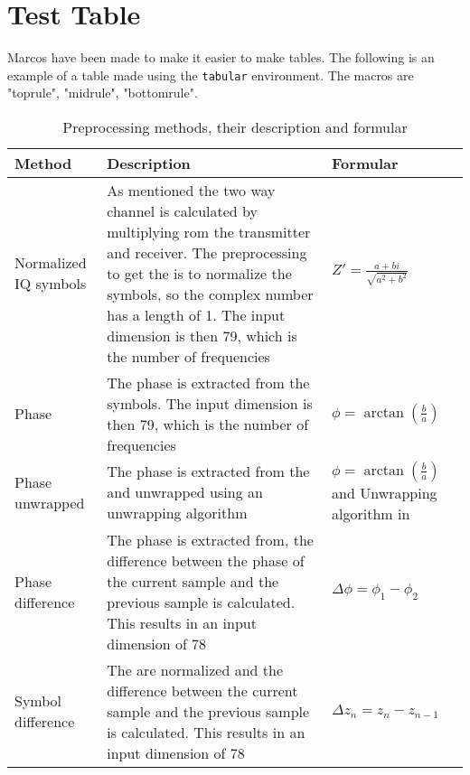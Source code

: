 \section{Test Table}\label{sec:Test-tabel}

Marcos have been made to make it easier to make tables.
The following is an example of a table made using the \texttt{tabular} environment.
The macros are "toprule", "midrule", "bottomrule".
\begin{table}[H]
    \centering
    \begin{tabular}{p{}p{}p{}}
        \toprule
        Method & Description & Formular \\
        \midrule
        Normalized IQ symbols & As mentioned  the two way channel is calculated by multiplying rom the transmitter and receiver.
        The preprocessing to get the is to normalize the symbols, so the complex number has a length of 1.
        The input dimension is then 79, which is the number of frequencies & $Z'=\frac{a+bi}{\sqrt{a^2+b^2}}$\\
        \midrule
        Phase & The phase is extracted from the symbols.
        The input dimension is then 79, which is the number of frequencies & $\phi=\arctan\left(\frac{b}{a}\right)$\\
        \midrule
        Phase \mbox{unwrapped} & The phase is extracted from the and unwrapped using an unwrapping algorithm & $\phi=\arctan\left(\frac{b}{a}\right)$ and Unwrapping algorithm in \\
        \midrule
        Phase \mbox{difference} & The phase is extracted from, the difference between the phase of the current sample and the previous sample is calculated.
        This results in an input dimension of 78 & $\Delta\phi = \phi_1 - \phi_2$\\
        \midrule
        Symbol \mbox{difference} & The are normalized and the difference between the current sample and the previous sample is calculated.
        This results in an input dimension of 78 & $\Delta z_n=z_n-z_{n-1}$\\
        \bottomrule
    \end{tabular}
    \caption{Preprocessing methods, their description and formular}
    \label{tab:preprocessing}
\end{table}
